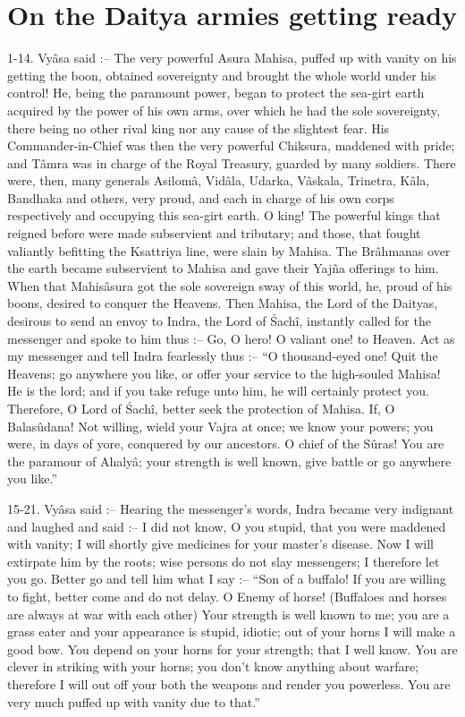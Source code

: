 ﻿\chapter{On the Daitya armies getting ready}

1-14. Vy\^asa said :-- The very powerful Asura Mahisa, puffed up with vanity on his getting the boon, obtained sovereignty and brought the whole world under his control! He, being the paramount power, began to protect the sea-girt earth acquired by the power of his own arms, over which he had the sole sovereignty, there being no other rival king nor any cause of the slightest fear. His Commander-in-Chief was then the very powerful Chiksura, maddened with pride; and T\^amra was in charge of the Royal Treasury, guarded by many soldiers. There were, then, many generals Asilom\^a, Vid\^ala, Udarka, V\^askala, Trinetra, K\^ala, Bandhaka and others, very proud, and each in charge of his own corps respectively and occupying this sea-girt earth. O king! The powerful kings that reigned before were made subservient and tributary; and those, that fought valiantly befitting the Ksattriya line, were slain by Mahisa. The Br\^ahmanas over the earth became subservient to Mahisa and gave their Yajña offerings to him. When that Mahis\^asura got the sole sovereign sway of this world, he, proud of his boons, desired to conquer the Heavens. Then Mahisa, the Lord of the Daityas, desirous to send an envoy to Indra, the Lord of \'Sach\^i, instantly called for the messenger and spoke to him thus :-- Go, O hero! O valiant one! to Heaven. Act as my messenger and tell Indra fearlessly thus :-- ``O thousand-eyed one! Quit the Heavens; go anywhere you like, or offer your service to the high-souled Mahisa! He is the lord; and if you take refuge unto him, he will certainly protect you. Therefore, O Lord of \'Sach\^i, better seek the protection of Mahisa. If, O Balas\^udana! Not willing, wield your Vajra at once; we know your powers; you were, in days of yore, conquered by our ancestors. O chief of the S\^uras! You are the paramour of Ahaly\^a; your strength is well known, give battle or go anywhere you like.''

15-21. Vy\^asa said :-- Hearing the messenger's words, Indra became very indignant and laughed and said :-- I did not know, O you stupid, that you were maddened with vanity; I will shortly give medicines for your master's disease. Now I will extirpate him by the roots; wise persons do not slay messengers; I therefore let you go. Better go and tell him what I say :-- ``Son of a buffalo! If you are willing to fight, better come and do not delay. O Enemy of horse! (Buffaloes and horses are always at war with each other) Your strength is well known to me; you are a grass eater and your appearance is stupid, idiotic; out of your horns I will make a good bow. You depend on your horns for your strength; that I well know. You are clever in striking with your horns; you don't know anything about warfare; therefore I will out off your both the weapons and render you powerless. You are very much puffed up with vanity due to that.''

